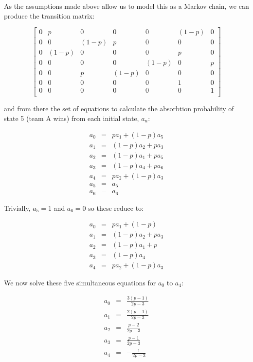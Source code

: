 \documentclass[a4paper,12pt]{article}
\begin{document}
As the assumptions made above allow us to model this as a Markov chain, we can
produce the transition matrix:

$$
\begin{bmatrix}
  0 & p & 0 & 0 & 0 & (1-p) & 0 \\
  0 & 0 & (1-p) & p & 0 & 0 & 0 \\
  0 & (1-p) & 0 & 0 & 0 & p & 0 \\
  0 & 0 & 0 & 0 & (1-p) & 0 & p \\
  0 & 0 & p & (1-p) & 0 & 0 & 0 \\
  0 & 0 & 0 & 0 & 0 & 1 & 0 \\
  0 & 0 & 0 & 0 & 0 & 0 & 1 \\
\end{bmatrix}
$$

and from there the set of equations to calculate the absorbtion probability of state 5
(team A wins) from each initial state, $a_n$:

\begin{eqnarray*}
  a_0 & = & pa_1 + (1-p)a_5 \\
  a_1 & = & (1-p)a_2 + pa_3 \\
  a_2 & = & (1-p)a_1 + pa_5 \\
  a_3 & = & (1-p)a_4 + pa_6 \\
  a_4 & = & pa_2 + (1-p)a_3 \\
  a_5 & = & a_5 \\
  a_6 & = & a_6
\end{eqnarray*}

Trivially, $a_5 = 1$ and $a_6 = 0$ so these reduce to:

\begin{eqnarray*}
  a_0 & = & pa_1 + (1-p) \\
  a_1 & = & (1-p)a_2 + pa_3 \\
  a_2 & = & (1-p)a_1 + p \\
  a_3 & = & (1-p)a_4 \\
  a_4 & = & pa_2 + (1-p)a_3
\end{eqnarray*}

We now solve these five simultaneous equations for $a_0$ to $a_4$:

\begin{eqnarray*}
  a_0 & = & \frac{3 \left(p - 1\right)}{2 p - 3} \\
  a_1 & = & \frac{2 \left(p - 1\right)}{2 p - 3} \\
  a_2 & = & \frac{p - 2}{2 p - 3} \\
  a_3 & = & \frac{p - 1}{2 p - 3} \\
  a_4 & = & - \frac{1}{2 p - 3}
\end{eqnarray*}
\end{document}
